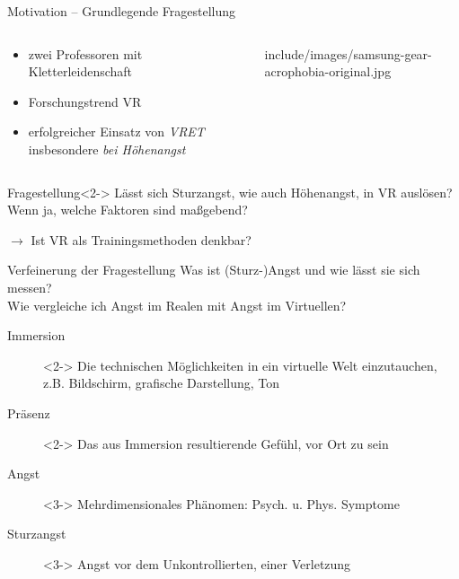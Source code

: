 \begin{frame}{Motivation -- Grundlegende Fragestellung}
\begin{columns}
	\begin{column}{0.48\textwidth}
		\begin{itemize}
			\item zwei Professoren mit Kletterleidenschaft
			\item Forschungstrend \gls{VR}
			\item erfolgreicher Einsatz von \textit{\gls{VRET}} insbesondere \textit{bei Höhenangst} \autocite{Emmelkamp2001}
		\end{itemize}
	\end{column}
	\begin{column}{0.44\textwidth}
		\vfill
		\hfill
		\begin{overpic}[width=0.9\columnwidth]{include/images/samsung-gear-acrophobia-original.jpg}
		\end{overpic}
	\end{column}
\end{columns}
\vfill
{}
\begin{block}{Fragestellung}<2->
	Lässt sich \textcolor{tracker}{Sturzangst}, wie auch Höhenangst, \textcolor{tracker}{in \gls{VR} auslösen?}\\Wenn ja, welche Faktoren sind maßgebend?
	
	\hfill $\rightarrow$ Ist \gls{VR} als Trainingsmethoden denkbar?
\end{block}
\end{frame}

\begin{frame}{Verfeinerung der Fragestellung}
Was ist (Sturz-)Angst und wie lässt sie sich messen?\\Wie vergleiche ich Angst im Realen mit Angst im Virtuellen?
\begin{description}
\item[Immersion]<2-> Die technischen Möglichkeiten in ein virtuelle Welt einzutauchen,\\z.B. Bildschirm, grafische Darstellung, Ton \autocite{McMahan2003}
\item[Präsenz]<2-> Das aus Immersion resultierende Gefühl, vor Ort zu sein \autocite{McMahan2003}
\item[Angst]<3-> Mehrdimensionales Phänomen: Psych. u. Phys. Symptome \autocite{Krohne1996}
\item[Sturzangst]<3-> Angst vor dem Unkontrollierten, einer Verletzung \autocite{Lewis2010}
\end{description}
\begin{center}
\end{center}
\end{frame}


